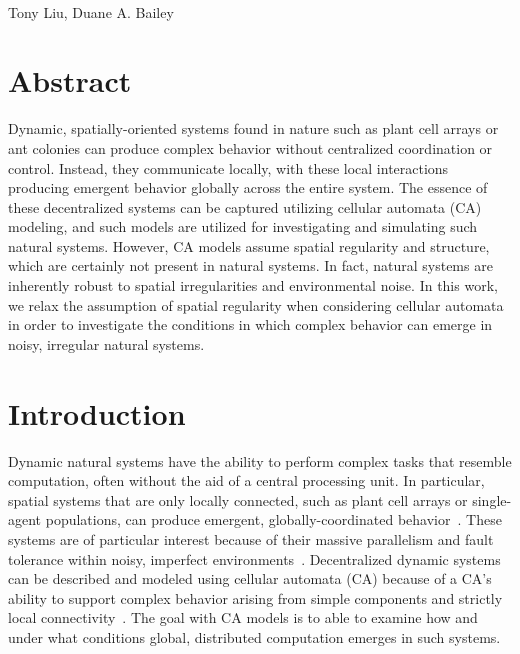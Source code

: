 \documentclass[a4paper,11pt]{article}
\begin{document}

\begin{flushleft}
{\Large
\textbf{}
}
\newline
\\
Tony Liu,
Duane A. Bailey

\end{flushleft}



\section*{Abstract}

Dynamic, spatially-oriented systems found in nature such as plant cell arrays or ant colonies can produce complex behavior without centralized coordination or control. Instead, they communicate locally, with these local interactions producing emergent behavior globally across the entire system. The essence of these decentralized systems can be captured utilizing cellular automata (CA) modeling, and such models are utilized for investigating and simulating such natural systems. However, CA models assume spatial regularity and structure, which are certainly not present in natural systems. In fact, natural systems are inherently robust to spatial irregularities and environmental noise. In this work, we relax the assumption of spatial regularity when considering cellular automata in order to investigate the conditions in which complex behavior can emerge in noisy, irregular natural systems.

\newpage

\tableofcontents
\listoffigures

\newpage
{}
\section{Introduction}
\label{sec:Intro}
Dynamic natural systems have the ability to perform complex tasks that resemble computation, often without the aid of a central processing unit. In particular, spatial systems that are only locally connected, such as plant cell arrays or single-agent populations, can produce emergent, globally-coordinated behavior~\cite{bi07, mo07}. These systems are of particular interest because of their massive parallelism and fault tolerance within noisy, imperfect environments~\cite{si99}. Decentralized dynamic systems can be described and modeled using cellular automata (CA) because of a CA's ability to support complex behavior arising from simple components and strictly local connectivity~\cite{mi96}. The goal with CA models is to able to examine how and under what conditions global, distributed computation emerges in such systems.
\end{document}
